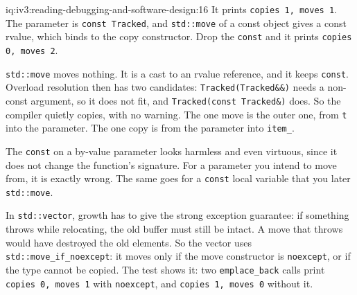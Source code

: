 \begin{solution}{iq:iv3:reading-debugging-and-software-design:16}
It prints \texttt{copies 1, moves 1}. The parameter is \texttt{const Tracked}, and \texttt{std::move} of a const object gives a const rvalue, which binds to the copy constructor. Drop the \texttt{const} and it prints \texttt{copies 0, moves 2}.

\texttt{std::move} moves nothing. It is a cast to an rvalue reference, and it keeps \texttt{const}. Overload resolution then has two candidates: \texttt{Tracked(Tracked\&\&)} needs a non-const argument, so it does not fit, and \texttt{Tracked(const Tracked\&)} does. So the compiler quietly copies, with no warning. The one move is the outer one, from \texttt{t} into the parameter. The one copy is from the parameter into \texttt{item\_}.

The \texttt{const} on a by-value parameter looks harmless and even virtuous, since it does not change the function's signature. For a parameter you intend to move from, it is exactly wrong. The same goes for a \texttt{const} local variable that you later \texttt{std::move}.

In \texttt{std::vector}, growth has to give the strong exception guarantee: if something throws while relocating, the old buffer must still be intact. A move that throws would have destroyed the old elements. So the vector uses \texttt{std::move\_if\_noexcept}: it moves only if the move constructor is \texttt{noexcept}, or if the type cannot be copied. The test shows it: two \texttt{emplace\_back} calls print \texttt{copies 0, moves 1} with \texttt{noexcept}, and \texttt{copies 1, moves 0} without it.


\end{solution}

